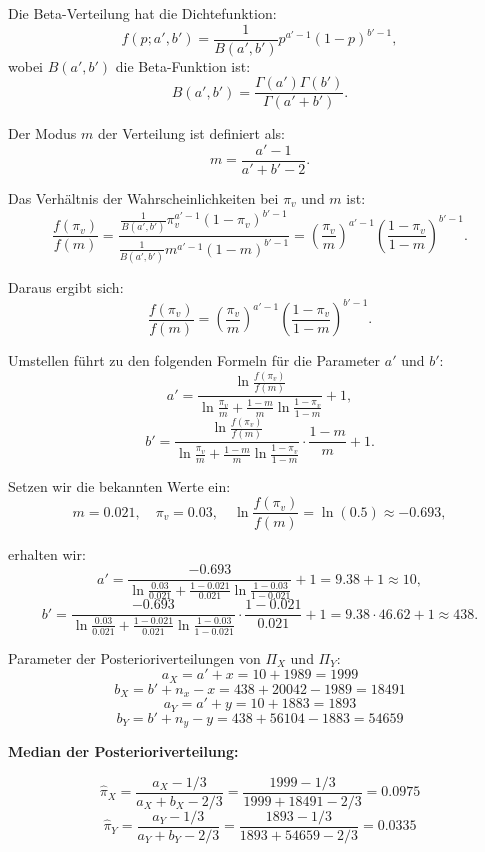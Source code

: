 \documentclass[a4paper,12pt]{article}
\begin{document}
Die Beta-Verteilung hat die Dichtefunktion:
\[
f(p; a', b') = \frac{1}{B(a', b')} p^{a'-1} (1-p)^{b'-1},
\]
wobei \( B(a', b') \) die Beta-Funktion ist:
\[
B(a', b') = \frac{\Gamma(a') \Gamma(b')}{\Gamma(a' + b')}.
\]

Der Modus \( m \) der Verteilung ist definiert als:
\[
m = \frac{a'-1}{a' + b' - 2}.
\]

Das Verhältnis der Wahrscheinlichkeiten bei \( \pi_v \) und \( m \) ist:
\[
\frac{f(\pi_v)}{f(m)} = \frac{\frac{1}{B(a', b')} \pi_v^{a'-1} (1-\pi_v)^{b'-1}}{\frac{1}{B(a', b')} m^{a'-1} (1-m)^{b'-1}} = \left( \frac{\pi_v}{m} \right)^{a'-1} \left( \frac{1-\pi_v}{1-m} \right)^{b'-1}.
\]

Daraus ergibt sich:
\[
\frac{f(\pi_v)}{f(m)} = \left( \frac{\pi_v}{m} \right)^{a'-1} \left( \frac{1-\pi_v}{1-m} \right)^{b'-1}.
\]

Umstellen führt zu den folgenden Formeln für die Parameter \( a' \) und \( b' \):
\[
a' = \frac{\ln \frac{f(\pi_v)}{f(m)}}{\ln \frac{\pi_v}{m} + \frac{1-m}{m} \ln \frac{1-\pi_v}{1-m}} + 1,
\]
\[
b' = \frac{\ln \frac{f(\pi_v)}{f(m)}}{\ln \frac{\pi_v}{m} + \frac{1-m}{m} \ln \frac{1-\pi_v}{1-m}} \cdot \frac{1-m}{m} + 1.
\]

Setzen wir die bekannten Werte ein:
\[
m = 0.021, \quad \pi_v = 0.03, \quad \ln \frac{f(\pi_v)}{f(m)} = \ln(0.5) \approx -0.693,
\]

erhalten wir:
\[
a' = \frac{-0.693}{\ln \frac{0.03}{0.021} + \frac{1-0.021}{0.021} \ln \frac{1-0.03}{1-0.021}} + 1 = 9.38 + 1 \approx 10,
\]
\[
b' = \frac{-0.693}{\ln \frac{0.03}{0.021} + \frac{1-0.021}{0.021} \ln \frac{1-0.03}{1-0.021}} \cdot \frac{1-0.021}{0.021} + 1 = 9.38 \cdot 46.62 + 1 \approx 438.
\]

Parameter der Posterioriverteilungen von $\Pi_X$ und $\Pi_Y$:
\begin{equation}
  a_X = a' + x = 10 + 1989 = 1999
\end{equation}
\begin{equation}
  b_X = b' + n_x - x = 438 + 20042 - 1989 = 18491
\end{equation}
\begin{equation}
  a_Y = a' + y = 10 + 1883 = 1893
\end{equation}
\begin{equation}
  b_Y = b' + n_y - y = 438 + 56104 - 1883 = 54659
\end{equation}

\textbf{Median der Posterioriverteilung:}

\begin{equation}
  \hat{\pi}_X = \frac{a_X - 1/3}{a_X + b_X - 2/3} = \frac{1999 - 1/3}{1999 + 18491 - 2/3} = 0.0975
\end{equation}
\begin{equation}
  \hat{\pi}_Y = \frac{a_Y - 1/3}{a_Y + b_Y - 2/3} = \frac{1893 - 1/3}{1893 + 54659 - 2/3} = 0.0335
\end{equation} 
\end{document}
